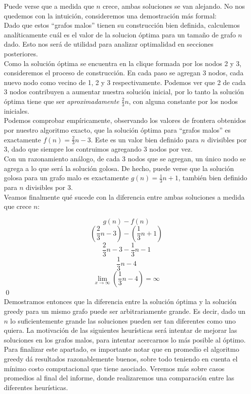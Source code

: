 Puede verse que a medida que $n$ crece, ambas soluciones se van alejando. No nos quedemos con la intuición, consideremos una demostración más formal: \\

Dado que estos ``grafos malos'' tienen su construcción bien definida, calculemos analíticamente cuál es el valor de la solucion óptima para un tamaño de grafo $n$ dado. Esto nos será de utilidad para analizar optimalidad en secciones posteriores. \\

Como la solución óptima se encuentra en la clique formada por los nodos 2 y 3, consideremos el proceso de construcción. En cada paso se agregan 3 nodos, cada nuevo nodo como vecino de 1, 2 y 3 respectivamente. Podemos ver que 2 de cada 3 nodos contribuyen a aumentar nuestra solución inicial, por lo tanto la solución óptima tiene que ser \textit{aproximadamente} $\frac{2}{3}n$, con alguna constante por los nodos iniciales. \\

Podemos comprobar empíricamente, observando los valores de frontera obtenidos por nuestro algoritmo exacto, que la solución óptima para ``grafos malos'' es exactamente $f(n) = \frac{2}{3}n - 3$. Este es un valor bien definido para $n$ divisibles por 3, dado que siempre los contruimos agregando 3 nodos por vez. \\

Con un razonamiento análogo, de cada 3 nodos que se agregan, un único nodo se agrega a lo que será la solución golosa. De hecho, puede verse que la solución golosa para un grafo malo es exactamente $g(n) = \frac{1}{3}n + 1$, también bien definido para $n$ divisibles por 3. \\

Veamos finalmente qué sucede con la diferencia entre ambas soluciones a medida que crece $n$:

$$g(n) - f(n)$$
$$(\frac{2}{3}n - 3) - (\frac{1}{3}n + 1)$$
$$\frac{2}{3}n - 3 - \frac{1}{3}n - 1$$
$$\frac{1}{3}n - 4$$
\[ \lim_{x \to \infty} (\frac{1}{3}n - 4) = \infty \] \qed \\

Demostramos entonces que la diferencia entre la solución óptima y la solución greedy para un mismo grafo puede ser arbitrariamente grande. Es decir, dado un $n$ lo suficientemente grande las soluciones pueden ser tan diferentes como uno quiera. La motivación de las siguientes heurísticas será intentar de mejorar las soluciones en los grafos malos, para intentar acercarnos lo más posible al óptimo. \\

Para finalizar este apartado, es importante notar que en promedio el algoritmo greedy dá resultados razonablemente buenos, sobre todo teniendo en cuenta el mínimo costo computacional que tiene asociado. Veremos más sobre casos promedios al final del informe, donde realizaremos una comparación entre las diferentes heurísticas. \\
